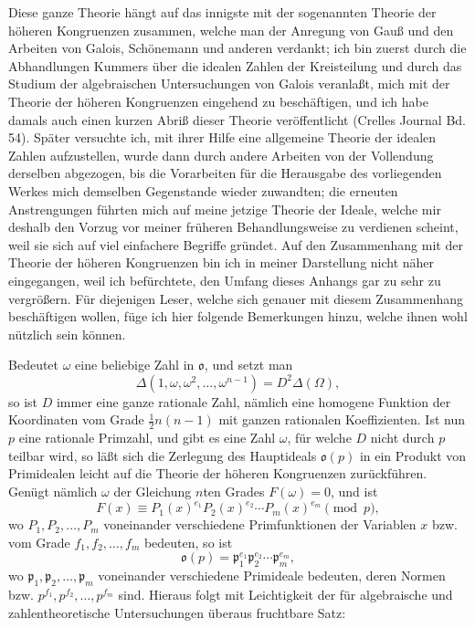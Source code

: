 \documentclass[11pt]{article}
\newcommand{\origpage}[1]{\par\vspace{0.25em}\noindent{\footnotesize\itshape [Gedruckte Seite #1]}\par\vspace{0.25em}}
\newcommand{\ideal}[1]{\mathfrak{#1}}
\begin{document}
\origpage{404}
Diese ganze Theorie hängt auf das innigste mit der sogenannten Theorie der höheren Kongruenzen zusammen, welche man der Anregung von Gauß und den Arbeiten von Galois, Schönemann und anderen verdankt; ich bin zuerst durch die Abhandlungen Kummers über die idealen Zahlen der Kreisteilung und durch das Studium der algebraischen Untersuchungen von Galois veranlaßt, mich mit der Theorie der höheren Kongruenzen eingehend zu beschäftigen, und ich habe damals auch einen kurzen Abriß dieser Theorie veröffentlicht (Crelles Journal Bd. 54). Später versuchte ich, mit ihrer Hilfe eine allgemeine Theorie der idealen Zahlen aufzustellen, wurde dann durch andere Arbeiten von der Vollendung derselben abgezogen, bis die Vorarbeiten für die Herausgabe des vorliegenden Werkes mich demselben Gegenstande wieder zuwandten; die erneuten Anstrengungen führten mich auf meine jetzige Theorie der Ideale, welche mir deshalb den Vorzug vor meiner früheren Behandlungsweise zu verdienen scheint, weil sie sich auf viel einfachere Begriffe gründet. Auf den Zusammenhang mit der Theorie der höheren Kongruenzen bin ich in meiner Darstellung nicht näher eingegangen, weil ich befürchtete, den Umfang dieses Anhangs gar zu sehr zu vergrößern. Für diejenigen Leser, welche sich genauer mit diesem Zusammenhang beschäftigen wollen, füge ich hier folgende Bemerkungen hinzu, welche ihnen wohl nützlich sein können.

Bedeutet $\omega$ eine beliebige Zahl in $\ideal{o}$, und setzt man
\[
\Delta(1,\omega,\omega^2,\ldots,\omega^{n-1})=D^2\Delta(\Omega),
\]
so ist $D$ immer eine ganze rationale Zahl, nämlich eine homogene Funktion der Koordinaten vom Grade $\frac12 n(n-1)$ mit ganzen rationalen Koeffizienten. Ist nun $p$ eine rationale Primzahl, und gibt es eine Zahl $\omega$, für welche $D$ nicht durch $p$ teilbar wird, so läßt sich die Zerlegung des Hauptideals $\ideal{o}(p)$ in ein Produkt von Primidealen leicht auf die Theorie der höheren Kongruenzen zurückführen. Genügt nämlich $\omega$ der Gleichung $n$ten Grades $F(\omega)=0$, und ist
\[
F(x)\equiv P_1(x)^{e_1}P_2(x)^{e_2}\cdots P_m(x)^{e_m}\pmod p,
\]
wo $P_1,P_2,\ldots,P_m$ voneinander verschiedene Primfunktionen der Variablen $x$ bzw. vom Grade $f_1,f_2,\ldots,f_m$ bedeuten, so ist
\[
\ideal{o}(p)=\ideal{p}_1^{e_1}\ideal{p}_2^{e_2}\cdots\ideal{p}_m^{e_m},
\]
wo $\ideal{p}_1,\ideal{p}_2,\ldots,\ideal{p}_m$ voneinander verschiedene Primideale bedeuten, deren Normen bzw. $p^{f_1},p^{f_2},\ldots,p^{f_m}$ sind. Hieraus folgt mit Leichtigkeit der für algebraische und zahlentheoretische Untersuchungen überaus fruchtbare Satz:
\end{document}
